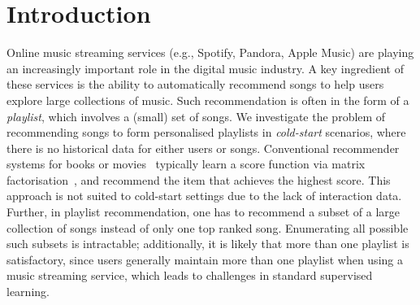 
\section{Introduction}
\label{sec:intro}
Online music streaming services (e.g., Spotify, Pandora, Apple Music) %
are playing an increasingly important role in the digital music industry.
A key ingredient of these services is the ability to automatically recommend songs to help users explore large collections of music.
Such recommendation is often in the form of a \emph{playlist}, 
which involves a (small) set of songs.
%
We investigate the problem of recommending songs to form personalised playlists 
in \emph{cold-start} scenarios, %
where there is no historical data for either users or songs.
%
Conventional recommender systems for books or movies~\citep{Sarwar:2001,Netflix}
typically learn a score function via matrix factorisation~\citep{Koren:2009},
and recommend the item that achieves the highest score.
This approach is not suited to %
cold-start settings
due to the lack of interaction data. %
%
Further, in playlist recommendation,
one has to recommend a subset of a large collection of songs instead of only one top ranked song.
Enumerating all possible such subsets is intractable;
additionally,
it is likely that more than one playlist is satisfactory, since
users generally maintain more than one playlist when using a music streaming service,
which leads to challenges in standard supervised learning.




